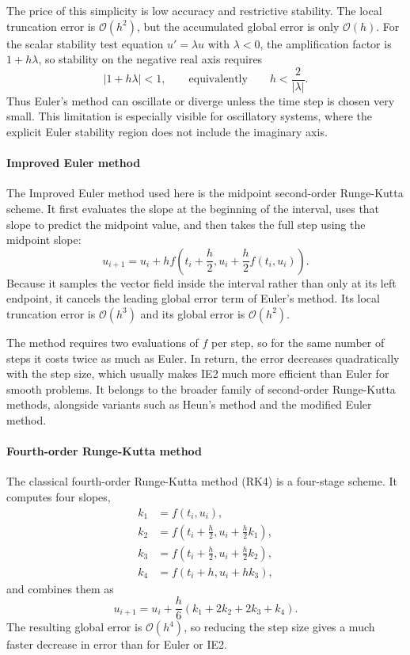 The price of this simplicity is low accuracy and restrictive stability. The
local truncation error is $\mathcal{O}(h^2)$, but the accumulated global error is
only $\mathcal{O}(h)$. For the scalar stability test equation $u'=\lambda u$
with $\lambda<0$, the amplification factor is $1+h\lambda$, so stability on the
negative real axis requires
\[
	|1+h\lambda|<1,
	\qquad\text{equivalently}\qquad
	h<\frac{2}{|\lambda|}.
\]
Thus Euler's method can oscillate or diverge unless the time step is chosen very
small. This limitation is especially visible for oscillatory systems, where the
explicit Euler stability region does not include the imaginary axis.

\paragraph{Improved Euler method}
The Improved Euler method used here is the midpoint second-order Runge-Kutta
scheme. It first evaluates the slope at the beginning of the interval, uses that
slope to predict the midpoint value, and then takes the full step using the
midpoint slope:
\[
	u_{i+1}
	= u_i + h f\left(t_i+\frac{h}{2},
	u_i+\frac{h}{2}f(t_i,u_i)\right).
\]
Because it samples the vector field inside the interval rather than only at its
left endpoint, it cancels the leading global error term of Euler's method. Its
local truncation error is $\mathcal{O}(h^3)$ and its global error is
$\mathcal{O}(h^2)$.

The method requires two evaluations of $f$ per step, so for the same number of
steps it costs twice as much as Euler. In return, the error decreases
quadratically with the step size, which usually makes IE2 much more efficient
than Euler for smooth problems. It belongs to the broader family of second-order
Runge-Kutta methods, alongside variants such as Heun's method and the modified
Euler method.

\paragraph{Fourth-order Runge-Kutta method}
The classical fourth-order Runge-Kutta method (RK4) is a four-stage scheme. It
computes four slopes,
\[
\begin{aligned}
	k_1 &= f(t_i,u_i),\\
	k_2 &= f\left(t_i+\frac{h}{2},u_i+\frac{h}{2}k_1\right),\\
	k_3 &= f\left(t_i+\frac{h}{2},u_i+\frac{h}{2}k_2\right),\\
	k_4 &= f(t_i+h,u_i+hk_3),
\end{aligned}
\]
and combines them as
\[
	u_{i+1}=u_i+\frac{h}{6}(k_1+2k_2+2k_3+k_4).
\]
The resulting global error is $\mathcal{O}(h^4)$, so reducing the step size gives
a much faster decrease in error than for Euler or IE2.

